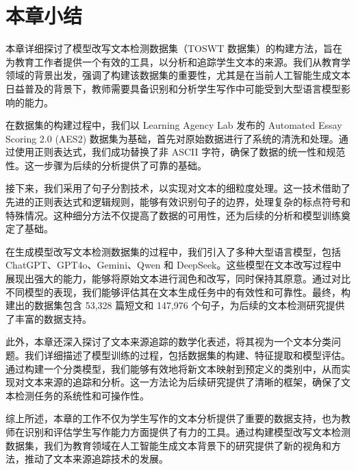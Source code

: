 \section{本章小结}
\label{sec:TOSWT-conclusion}

本章详细探讨了模型改写文本检测数据集（TOSWT 数据集）的构建方法，旨在为教育工作者提供一个有效的工具，以分析和追踪学生文本的来源。我们从教育学领域的背景出发，强调了构建该数据集的重要性，尤其是在当前人工智能生成文本日益普及的背景下，教师需要具备识别和分析学生写作中可能受到大型语言模型影响的能力。

在数据集的构建过程中，我们以 Learning Agency Lab 发布的 Automated Essay Scoring 2.0 (AES2) 数据集为基础，首先对原始数据进行了系统的清洗和处理。通过使用正则表达式，我们成功替换了非 ASCII 字符，确保了数据的统一性和规范性。这一步骤为后续的分析提供了可靠的基础。

接下来，我们采用了句子分割技术，以实现对文本的细粒度处理。这一技术借助了先进的正则表达式和逻辑规则，能够有效识别句子的边界，处理复杂的标点符号和特殊情况。这种细分方法不仅提高了数据的可用性，还为后续的分析和模型训练奠定了基础。

在生成模型改写文本检测数据集的过程中，我们引入了多种大型语言模型，包括 ChatGPT、GPT4o、Gemini、Qwen 和 DeepSeek。这些模型在文本改写过程中展现出强大的能力，能够将原始文本进行润色和改写，同时保持其原意。通过对比不同模型的表现，我们能够评估其在文本生成任务中的有效性和可靠性。最终，构建出的数据集包含 53,328 篇短文和 147,976 个句子，为后续的文本检测研究提供了丰富的数据支持。

此外，本章还深入探讨了文本来源追踪的数学化表述，将其视为一个文本分类问题。我们详细描述了模型训练的过程，包括数据集的构建、特征提取和模型评估。通过构建一个分类模型，我们能够有效地将新文本映射到预定义的类别中，从而实现对文本来源的追踪和分析。这一方法论为后续研究提供了清晰的框架，确保了文本检测任务的系统性和可操作性。

综上所述，本章的工作不仅为学生写作的文本分析提供了重要的数据支持，也为教师在识别和评估学生写作能力方面提供了有力的工具。通过构建模型改写文本检测数据集，我们为教育领域在人工智能生成文本背景下的研究提供了新的视角和方法，推动了文本来源追踪技术的发展。